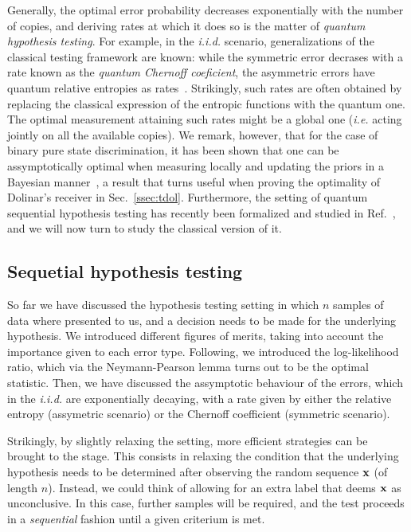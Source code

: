 Generally, the optimal error probability decreases exponentially with the number of copies, and deriving rates at which it does so is the matter of \textit{quantum hypothesis testing}. For example, in the \textit{i.i.d.} scenario, generalizations of the classical testing framework are known: while the symmetric error decrases with a rate known as the \textit{quantum Chernoff coeficient}\cite{Audenaert2007Discrimination}, the asymmetric errors have quantum relative entropies as rates~\cite{Hiai1991,Stein2}. Strikingly, such rates are often obtained by replacing the classical expression of the entropic functions with the quantum one. The optimal measurement attaining such rates might be a global one (\textit{i.e.} acting jointly on all the available copies). We remark, however, that for the case of binary pure state discrimination, it has been shown that one can be assymptotically optimal when measuring locally and updating the priors in a Bayesian manner~\cite{Acin2005Multi}, a result that turns useful when proving the optimality of Dolinar's receiver in Sec.~\ref{ssec:tdol}. Furthermore, the setting of quantum sequential hypothesis testing has recently been formalized and studied in Ref.~\cite{Vargas2021quantum}, and we will now turn to study the classical version of it.

\subsection{Sequetial hypothesis testing}\label{ssec:sprt}
So far we have discussed the hypothesis testing setting in which $n$ samples of data where presented to us, and a decision needs to be made for the underlying hypothesis. We introduced different figures of merits, taking into account the importance given to each error type. Following, we introduced the log-likelihood ratio, which via the Neymann-Pearson lemma turns out to be the optimal statistic. Then, we have discussed the assymptotic behaviour of the errors, which in the \textit{i.i.d.} are exponentially decaying, with a rate given by either the relative entropy (assymetric scenario) or the Chernoff coefficient (symmetric scenario).

Strikingly, by slightly relaxing the setting, more efficient strategies can be brought to the stage. This consists in relaxing the condition that the underlying hypothesis needs to be determined after observing the random sequence $\mathbf{x}$ (of length $n$). Instead, we could think of allowing for an extra label that deems $\mathbf{x}$ as unconclusive. In this case, further samples will be required, and the test proceeds in a \textit{sequential} fashion until a given criterium is met.

